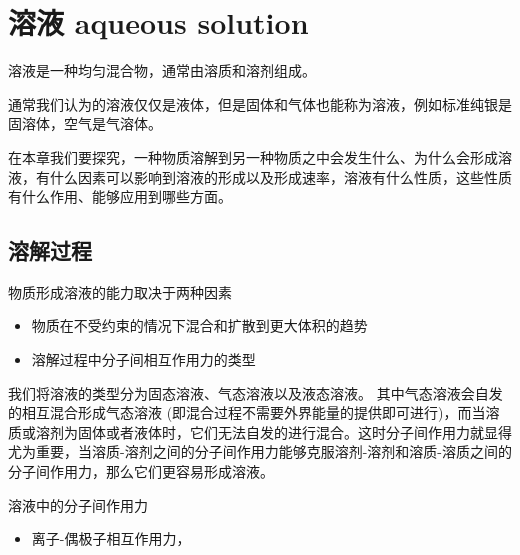 \section{溶液 aqueous solution}
溶液是一种均匀混合物，通常由溶质和溶剂组成。

通常我们认为的溶液仅仅是液体，但是固体和气体也能称为溶液，例如标准纯银是固溶体，空气是气溶体。

在本章我们要探究，一种物质溶解到另一种物质之中会发生什么、为什么会形成溶液，有什么因素可以影响到溶液的形成以及形成速率，溶液有什么性质，这些性质有什么作用、能够应用到哪些方面。

\subsection{溶解过程}
物质形成溶液的能力取决于两种因素
\begin{itemize}
	\item 物质在不受约束的情况下混合和扩散到更大体积的趋势
	\item 溶解过程中分子间相互作用力的类型
	
\end{itemize}

我们将溶液的类型分为固态溶液、气态溶液以及液态溶液。
其中气态溶液会自发的相互混合形成气态溶液 (即混合过程不需要外界能量的提供即可进行)，而当溶质或溶剂为固体或者液体时，它们无法自发的进行混合。这时分子间作用力就显得尤为重要，当溶质-溶剂之间的分子间作用力能够克服溶剂-溶剂和溶质-溶质之间的分子间作用力，那么它们更容易形成溶液。

溶液中的分子间作用力
\begin{itemize}
	\item 离子-偶极子相互作用力，
	
\end{itemize}



